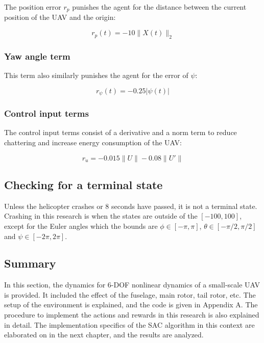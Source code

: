 The position error $r_{p}$ punishes the agent for the distance between the current position of the UAV and the origin:

\begin{equation}
	r_{p}(t) = -10 \| X(t) \|_2
\end{equation}


\subsubsection{Yaw angle term}

This term also similarly punishes the agent for the error of $\psi$:

\begin{equation}
	r_{\psi}(t) = -0.25 | \psi(t) |
\end{equation}

\subsubsection{Control input terms}

The control input terms consist of a derivative and a norm term to reduce chattering and increase energy consumption of the UAV:

\begin{equation} \label{control_reward}
	r_u = - 0.015 \|U\| - 0.08 \|U'\| 
\end{equation}

\subsection{Checking for a terminal state}

Unless the helicopter crashes or 8 seconds have passed, it is not a terminal state. Crashing in this research is when the states are outside of the $[-100,100]$, except for the Euler angles which the bounds are $ \phi \in [-\pi,\pi]$, $ \theta \in [-\pi/2,\pi/2]$ and $ \psi \in [-2\pi,2\pi]$.
\subsection{Summary}

In this section, the dynamics for 6-DOF nonlinear dynamics of a small-scale
UAV is provided. It included the effect of the fuselage, main rotor, tail rotor, etc. The setup of the environment is explained, and the code is given in Appendix A. The procedure to implement the actions and rewards in this research is also explained in detail. The implementation specifics of the SAC algorithm in this context are elaborated on in the next chapter, and the results are analyzed.  
